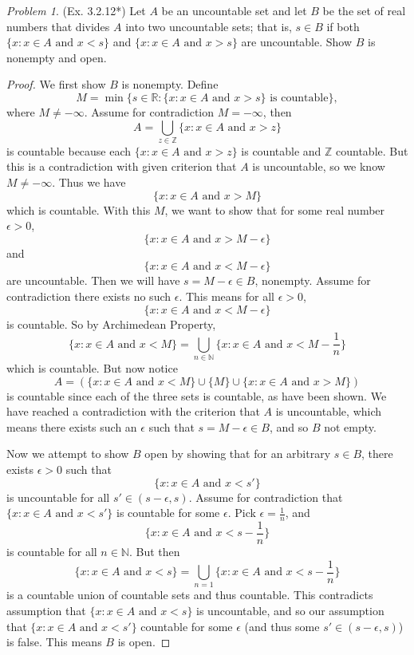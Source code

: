 \documentclass[11pt,twoside, reqno]{amsart}
\theoremstyle{remark}
\newtheorem{Prob}{Problem}
\def\R{\mathbb R}
\def\N{\mathbb N}
\def\Z{\mathbb Z}
\begin{document}
\begin{Prob}(Ex. 3.2.12*) Let $A$ be an uncountable set and let $B$ be the set of real numbers that divides $A$ into two uncountable sets; that is, $s \in B$ if both $\{x : x \in A \text{ and } x < s\}$ and $\{x : x \in A \text{ and } x > s\}$ are uncountable. Show $B$ is nonempty and open.
\end{Prob}

\begin{proof}
We first show $B$ is nonempty. Define
$$
    M = \min \{s \in \R : \{x : x \in A \text{ and } x > s\} \text{ is countable}\},
$$
where $M \neq -\infty$. Assume for contradiction $M = -\infty$, then
$$
    A = \bigcup_{z \in \Z} \{x : x \in A \text{ and } x > z\}
$$
is countable because each $\{x : x \in A \text{ and } x > z\}$ is countable and $\Z$ countable. But this is a contradiction with given criterion that $A$ is uncountable, so we know $M \neq -\infty$. Thus we have
$$
    \{x : x \in A \text{ and } x > M\}
$$
which is countable. With this $M$, we want to show that for some real number $\epsilon > 0$, 
$$
    \{x : x \in A \text{ and } x > M - \epsilon\}
$$
and
$$
    \{x : x \in A \text{ and } x < M - \epsilon\}
$$
are uncountable. Then we will have $s = M - \epsilon \in B$, nonempty. Assume for contradiction there exists no such $\epsilon$. This means for all $\epsilon > 0$,
$$
    \{x : x \in A \text{ and } x < M - \epsilon\}
$$
is countable. So by Archimedean Property, 
$$
    \{x : x \in A \text{ and } x < M\} = \bigcup_{n \in \N} \{x : x \in A \text{ and } x < M - \frac{1}{n}\}
$$
which is countable. But now notice
$$
    A = (\{x : x \in A \text{ and } x < M\} \cup \{M\} \cup \{x : x \in A \text{ and } x > M\})
$$
is countable since each of the three sets is countable, as have been shown. We have reached a contradiction with the criterion that $A$ is uncountable, which means there exists such an $\epsilon$ such that $s = M - \epsilon \in B$, and so $B$ not empty.

Now we attempt to show $B$ open by showing that for an arbitrary $s \in B$, there exists $\epsilon > 0$ such that
$$
    \{x : x \in A \text{ and } x < s'\}
$$
is uncountable for all $s' \in (s-\epsilon, s)$. Assume for contradiction that $\{x : x \in A \text{ and } x < s'\}$ is countable for some $\epsilon$. Pick $\epsilon = \frac{1}{n}$, and
$$
    \{x : x \in A \text{ and } x < s - \frac{1}{n}\}
$$
is countable for all $n \in \N$. But then
$$
    \{x : x \in A \text{ and } x < s\} = \bigcup_{n=1} \{x : x \in A \text{ and } x < s - \frac{1}{n}\}
$$
is a countable union of countable sets and thus countable. This contradicts assumption that $\{x : x \in A \text{ and } x < s\}$ is uncountable, and so our assumption that $\{x : x \in A \text{ and } x < s'\}$ countable for some $\epsilon$ (and thus some $s' \in (s-\epsilon,s)$) is false. This means $B$ is open.

\end{proof}
\end{document}
